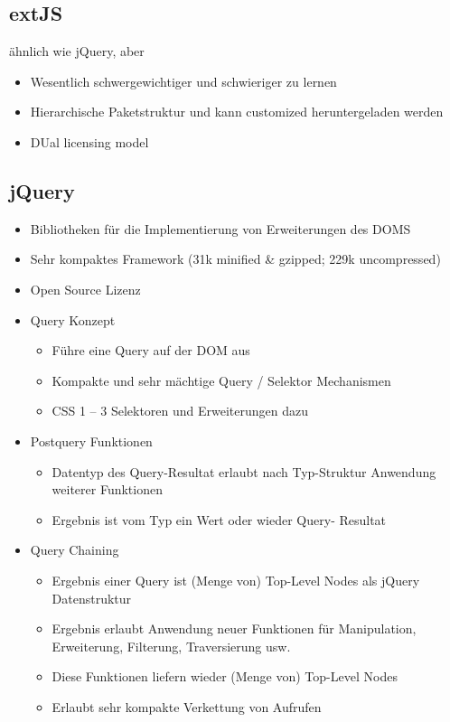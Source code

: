 \documentclass{article} %
\begin{document}
		\subsection{extJS} 
		ähnlich wie jQuery, aber
		\begin{itemize}					
			\item Wesentlich schwergewichtiger und schwieriger zu lernen
			\item Hierarchische Paketstruktur und kann customized heruntergeladen werden
			\item DUal licensing model
		\end{itemize}
		\subsection{jQuery}
		\begin{itemize}
			\item Bibliotheken für die Implementierung von Erweiterungen des DOMS
			\item Sehr kompaktes Framework (31k minified \& gzipped; 229k uncompressed)
			\item Open Source Lizenz
			\item Query Konzept
			\begin{itemize}
				\item Führe eine Query auf der DOM aus
				\item Kompakte und sehr mächtige Query / Selektor Mechanismen
				\item CSS 1 – 3 Selektoren und Erweiterungen dazu
			\end{itemize}
			\item Postquery Funktionen
			\begin{itemize}
				\item Datentyp des Query-Resultat erlaubt nach Typ-Struktur Anwendung weiterer Funktionen
				\item Ergebnis ist vom Typ ein Wert oder wieder Query- Resultat
			\end{itemize}
			\item Query Chaining
			\begin{itemize}
				\item Ergebnis einer Query ist (Menge von) Top-Level Nodes als jQuery Datenstruktur
				\item Ergebnis erlaubt Anwendung neuer Funktionen für Manipulation, Erweiterung, Filterung, Traversierung usw.
				\item Diese Funktionen liefern wieder (Menge von) Top-Level Nodes
				\item Erlaubt sehr kompakte Verkettung von Aufrufen

\end{itemize}
\end{itemize}
\end{document}
